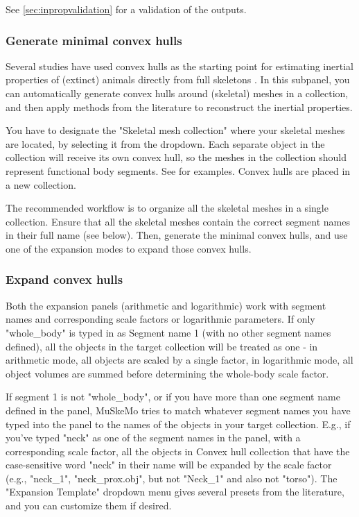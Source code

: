 \documentclass{article}
\begin{document}
See \ref{sec:inpropvalidation} for a validation of the outputs.

\subsubsection{Generate minimal convex hulls}
Several studies have used convex hulls as the starting point for estimating inertial properties of (extinct) animals directly from full skeletons \cite{sellersMinimumConvexHull2012,brasseyScalingConvexHull2014,brasseyConvexhullMassEstimates2016,brasseyVolumetricTechniqueFossil2018,coathamConvexHullEstimation2021,macaulayDecouplingBodyShape2023,wrightVolumetricElementscalingMass2024,batesRunningPerformanceAustralopithecus2025}.
In this subpanel, you can automatically generate convex hulls around (skeletal) meshes in a collection, and then apply methods from the literature to reconstruct the inertial properties.

You have to designate the "Skeletal mesh collection" where your skeletal meshes are located, by selecting it from the dropdown. Each separate object in the collection will receive its own convex hull, so the meshes in the collection should represent functional body segments. See \cite{sellersMinimumConvexHull2012,coathamConvexHullEstimation2021, macaulayDecouplingBodyShape2023} for examples. Convex hulls are placed in a new collection. 

The recommended workflow is to organize all the skeletal meshes in a single collection. Ensure that all the skeletal meshes contain the correct segment names in their full name (see below). Then, generate the minimal convex hulls, and use one of the expansion modes to expand those convex hulls.


\subsubsection{Expand convex hulls} 

Both the expansion panels (arithmetic and logarithmic) work with segment names and corresponding scale factors or logarithmic parameters. If only "whole\_body" is typed in as Segment name 1 (with no other segment names defined), all the objects in the target collection will be treated as one - in arithmetic mode, all objects are scaled by a single factor, in logarithmic mode, all object volumes are summed before determining the whole-body scale factor. 

If segment 1 is not "whole\_body", or if you have more than one segment name defined in the panel, MuSkeMo tries to match whatever segment names you have typed into the panel to the names of the objects in your target collection. E.g., if you've typed "neck" as one of the segment names in the panel, with a corresponding scale factor, all the objects in Convex hull collection that have the case-sensitive word "neck" in their name will be expanded by the scale factor (e.g., "neck\_1", "neck\_prox.obj", but not "Neck\_1" and also not "torso"). The "Expansion Template" dropdown menu gives several presets from the literature, and you can customize them if desired.
\end{document}
